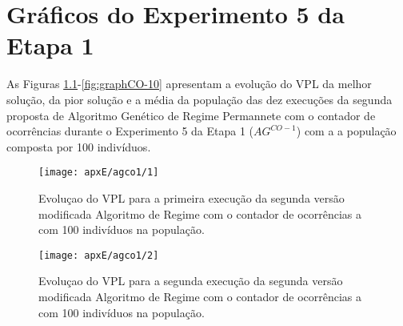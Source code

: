 \chapter{Gráficos do Experimento 5 da Etapa 1}

As Figuras \ref{fig:graphCO-01}-\ref{fig:graphCO-10} apresentam a evolução do VPL da melhor solução, da pior solução e a média da população das dez execuções da segunda proposta de Algoritmo Genético de Regime Permannete com o contador de ocorrências durante o Experimento 5 da Etapa 1 ($AG^{CO-1}$) com a a população composta por 100 indivíduos.

\begin{figure}[H]
\centering

\texttt{[image: apxE/agco1/1]}
\caption{Evoluçao do VPL para a primeira execução da segunda versão modificada Algoritmo de Regime com o contador de ocorrências a com 100 indivíduos na população.}
\label{fig:graphCO-01}
\end{figure}

\begin{figure}[H]
\centering

\texttt{[image: apxE/agco1/2]}
\caption{Evoluçao do VPL para a segunda execução da segunda versão modificada Algoritmo de Regime com o contador de ocorrências a com 100 indivíduos na população.}
\label{fig:graphCO-02}
\end{figure}

